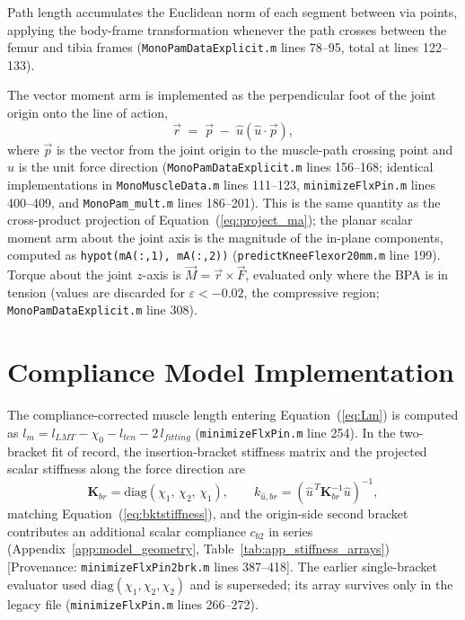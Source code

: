 Path length accumulates the Euclidean norm of each segment between via points, applying the body-frame transformation whenever the path crosses between the femur and tibia frames (\texttt{MonoPamDataExplicit.m} lines 78--95, total at lines 122--133).

The vector moment arm is implemented as the perpendicular foot of the joint origin onto the line of action,
\begin{equation}
    \vec{r} \;=\; \vec{p} \;-\; \hat{u}\left(\hat{u}\cdot\vec{p}\right),
    \label{eq:app_perpfoot}
\end{equation}
where $\vec{p}$ is the vector from the joint origin to the muscle-path crossing point and $\hat{u}$ is the unit force direction (\texttt{MonoPamDataExplicit.m} lines 156--168; identical implementations in \texttt{MonoMuscleData.m} lines 111--123, \texttt{minimizeFlxPin.m} lines 400--409, and \texttt{MonoPam\_mult.m} lines 186--201). This is the same quantity as the cross-product projection of Equation~(\ref{eq:project_ma}); the planar scalar moment arm about the joint axis is the magnitude of the in-plane components, computed as \texttt{hypot(mA(:,1), mA(:,2))} (\texttt{predictKneeFlexor20mm.m} line 199). Torque about the joint $z$-axis is $\vec{M} = \vec{r}\times\vec{F}$, evaluated only where the BPA is in tension (values are discarded for $\varepsilon < -0.02$, the compressive region; \texttt{MonoPamDataExplicit.m} line 308).

\section{Compliance Model Implementation}

The compliance-corrected muscle length entering Equation~(\ref{eq:Lm}) is computed as $l_{m} = l_{LMT} - \chi_{0} - l_{ten} - 2\,l_{fitting}$ (\texttt{minimizeFlxPin.m} line 254). In the two-bracket fit of record, the insertion-bracket stiffness matrix and the projected scalar stiffness along the force direction are
\begin{equation}
    \mathbf{K}_{br} = \mathrm{diag}(\chi_{1},\,\chi_{2},\,\chi_{1}),
    \qquad
    k_{\hat{u},br} = \left(\hat{u}^{\,T}\mathbf{K}_{br}^{-1}\hat{u}\right)^{-1},
    \label{eq:app_kbr}
\end{equation}
matching Equation~(\ref{eq:bktstiffness}), and the origin-side second bracket contributes an additional scalar compliance $c_{b2}$ in series (Appendix~\ref{app:model_geometry}, Table~\ref{tab:app_stiffness_arrays}) [Provenance: \texttt{minimizeFlxPin2brk.m} lines 387--418]. The earlier single-bracket evaluator used $\mathrm{diag}(\chi_{1},\chi_{2},\chi_{2})$ and is superseded; its array survives only in the legacy file (\texttt{minimizeFlxPin.m} lines 266--272).

